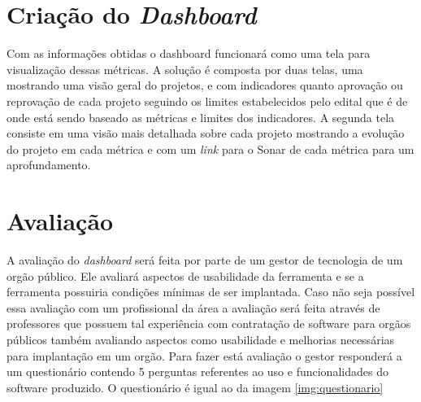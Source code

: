 \section{Criação do \textit{Dashboard}}
Com as informações obtidas o dashboard funcionará como uma tela para visualização dessas métricas. A solução é composta por duas telas, uma mostrando uma visão geral do projetos, e com indicadores quanto aprovação ou reprovação de cada projeto seguindo os limites estabelecidos pelo edital \cite{edital} que é de onde está sendo baseado as métricas e limites dos indicadores. A segunda tela consiste em uma visão mais detalhada sobre cada projeto mostrando a evolução do projeto em cada métrica e com um \textit{link} para o Sonar de cada métrica para um aprofundamento.

\section{Avaliação}
A avaliação do \textit{dashboard} será feita por parte de um gestor de tecnologia de um orgão público. Ele avaliará aspectos de usabilidade da ferramenta e se a ferramenta possuiria condições mínimas de ser implantada. Caso não seja possível essa avaliação com um profissional da área a avaliação será feita através de professores que possuem tal experiência com contratação de software para orgãos públicos também avaliando aspectos como usabilidade e melhorias necessárias para implantação em um orgão.
Para fazer está avaliação o gestor responderá a um questionário contendo 5 perguntas referentes ao uso e funcionalidades do software produzido. O questionário é igual ao da imagem \ref{img:questionario}

